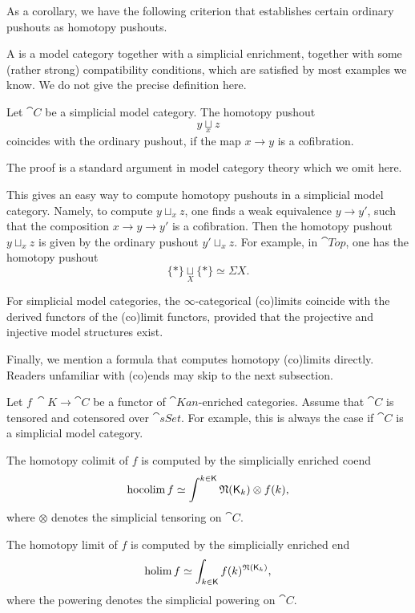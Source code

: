 As a corollary, we have the following criterion
that establishes certain ordinary pushouts as homotopy pushouts.

A 
is a model category together with a simplicial enrichment,
together with some (rather strong) compatibility conditions,
which are satisfied by most examples we know.
We do not give the precise definition here.

\begin{proposition}
    Let $\cat C$ be a simplicial model category.
    The homotopy pushout 
    \[ y\underset{x}{\sqcup}z \]
    coincides with the ordinary pushout,
    if the map $x\to y$ is a cofibration.
\end{proposition}

The proof is a standard argument in model category theory 
which we omit here.

This gives an easy way to compute homotopy pushouts
in a simplicial model category. Namely,
to compute $y\sqcup_xz$, one finds a weak equivalence $y\to y'$,
such that the composition $x\to y\to y'$ is a cofibration.
Then the homotopy pushout $y\sqcup_xz$
is given by the ordinary pushout $y'\sqcup_xz$. For example,
in $\cat{Top}$, one has the homotopy pushout
\[ \{*\}\underset{X}{\sqcup}\{*\}\simeq\Sigma X. \]

\begin{remark}
    For simplicial model categories, 
    the $\infty$-categorical (co)limits coincide with 
    the derived functors of the (co)limit functors,
    provided that the projective and injective model structures exist.
    \varqed
\end{remark}

Finally, we mention a formula that computes homotopy (co)limits directly.
Readers unfamiliar with (co)ends may skip to the next subsection.

\begin{proposition}
    Let $f\:\cat K\to\cat C$ be a functor of $\cat{Kan}$-enriched categories.
    Assume that $\cat C$ is tensored and cotensored over $\cat{sSet}$.
    For example, this is always the case if $\cat C$ is a simplicial model category.
    
    \begin{itms}
        \item The homotopy colimit of $f$
        is computed by the simplicially enriched coend 
        \[ \operatorname{hocolim}f\simeq\int^{k\in\mathsf{K}}\mathfrak{N}(\mathsf{K}_{k\/})\otimes f(k), \]
        where $\otimes$ denotes the simplicial tensoring on $\cat C$.
        \item The homotopy limit of $f$ is computed by the simplicially enriched end
        \[ \operatorname{holim}f\simeq\int_{k\in\mathsf{K}}f(k)^{\mathfrak{N}(\mathsf{K}_{\/k})}, \]
        where the powering denotes the simplicial powering on $\cat C$.
    \end{itms}
\end{proposition}

